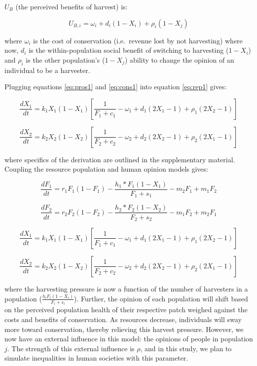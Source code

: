 \documentclass[
  12pt,
]{article}
\begin{document}
\(U_B\) (the perceived benefits of harvest) is:

\begin{equation} 
U_{B,i} = \omega_i + d_i(1-X_i) + \rho_i(1-X_j)
  \label{eq:cons1}
\end{equation}

where \(\omega_i\) is the cost of conservation (i.e.~revenue lost by not harvesting) where now, \(d_i\) is the within-population social benefit of switching to harvesting (\(1-X_i\)) and \(\rho_i\) is the other population's (\(1-X_j\)) ability to change the opinion of an individual to be a harvester.

Plugging equations \eqref{eq:pros1} and \eqref{eq:cons1} into equation \eqref{eq:rep1} gives:

\begin{equation} 
\frac{dX_1}{dt} =  k_1X_1(1-X_1) [\frac{1}{F_1+c_1} - \omega_1 + d_1(2X_1 - 1) + \rho_1(2X_2 - 1)]
  \label{eq:social1}
\end{equation}

\begin{equation} 
\frac{dX_2}{dt} = k_2X_2(1-X_2)  [\frac{1}{F_2+c_2} - \omega_2 + d_2(2X_2 - 1) +  \rho_2(2X_1 - 1)]
  \label{eq:social2}
\end{equation}

where specifics of the derivation are outlined in the supplementary material. Coupling the resource population and human opinion models gives:

\begin{equation}
\frac{dF_1}{dt} = r_1F_1(1-F_1)-\frac{h_1*F_1(1-X_1)}{F_1 + s_1} -m_2F_1 + m_1F_2
  \label{eq:FishWhole1}
\end{equation}

\begin{equation}
\frac{dF_2}{dt} = r_2F_2(1-F_2)-\frac{h_2*F_2(1-X_2)}{F_2 + s_2} -m_1F_2 + m_2F_1
  \label{eq:FishWhole2}
\end{equation}

\begin{equation}
\frac{dX_1}{dt} =  k_1X_1(1-X_1) [\frac{1}{F_1+c_1} - \omega_1 + d_1(2X_1 - 1) + \rho_1(2X_2 - 1)]
  \label{eq:SocWhole1}
\end{equation}

\begin{equation}
\frac{dX_2}{dt} = k_2X_2(1-X_2)  [\frac{1}{F_2+c_2} - \omega_2 + d_2(2X_2 - 1) +  \rho_2(2X_1 - 1)]
  \label{eq:SocWhole2}
\end{equation}

where the harvesting pressure is now a function of the number of harvesters in a population (\(\frac{h_iF_i(1-X_i)}{F_i + s_i}\)). Further, the opinion of each population will shift based on the perceived population health of their respective patch weighed against the costs and benefits of conservation. As resources decrease, individuals will sway more toward conservation, thereby relieving this harvest pressure. However, we now have an external influence in this model: the opinions of people in population \(j\). The strength of this external influence is \(\rho\), and in this study, we plan to simulate inequalities in human societies with this parameter.
\end{document}
